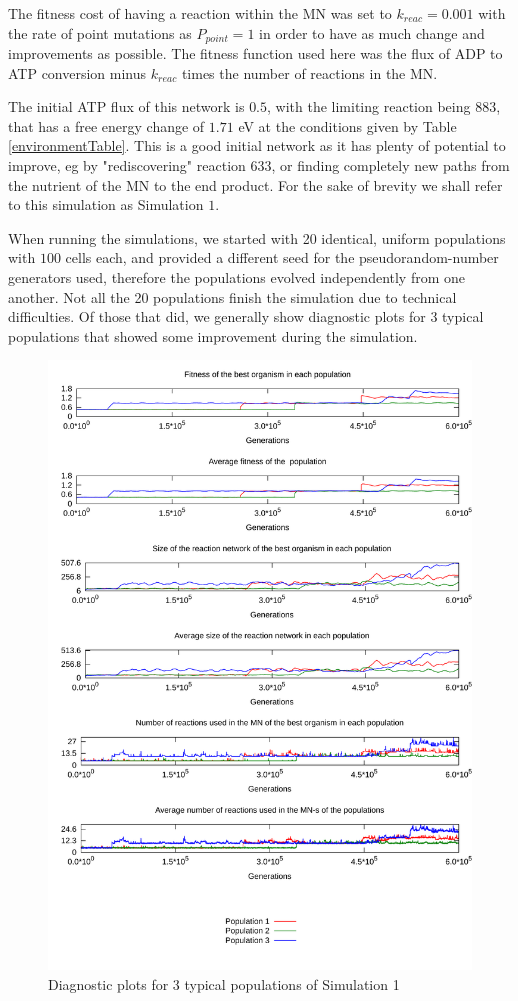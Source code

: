 \documentclass[a4paper,12pt]{article}
\begin{document}
The fitness cost of having a reaction within the MN was set to $k_{reac}=0.001$ with the rate of point mutations as $P_{point}=1$ in order to have as much change and improvements as possible. The fitness function used here was the flux of ADP to ATP conversion minus $k_{reac}$ times the number of reactions in the MN.

The initial ATP flux of this network is $0.5$, with the limiting reaction being $883$, that has a free energy change of $1.71$ eV at the conditions given by Table \ref{environmentTable}. This is a good initial network as it has plenty of potential to improve, eg by "rediscovering" reaction $633$, or finding completely new paths from the nutrient of the MN to the end product. For the sake of brevity we shall refer to this simulation as Simulation $1$.

When running the simulations, we started with 20 identical, uniform populations with $100$ cells each, and provided a different seed for the pseudorandom-number generators used, therefore the populations evolved independently from one another. Not all the 20 populations finish the simulation due to technical difficulties. Of those that did, we generally show diagnostic plots for 3 typical populations that showed some improvement during the simulation.




\begin{figure}[htpb]
	\centering
	\includegraphics[width=0.8\linewidth]{simulation1.pdf}
	\caption{Diagnostic plots for 3 typical populations of Simulation 1}
	\label{fig:simulation1}
\end{figure}
\end{document}
